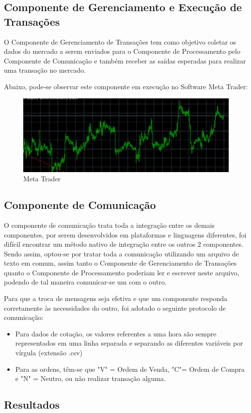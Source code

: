 \pagebreak

\subsection[Componente de Gerenciamento e Execução de Transações]{Componente de Gerenciamento e Execução de Transações}

O Componente de Gerenciamento de Transações tem como objetivo coletar os dados do mercado a serem enviados para o Componente de Processamento pelo Componente de Comunicação e também receber as saídas esperadas para realizar uma transação no mercado.

Abaixo, pode-se observar este componente em execução no Software Meta Trader:

\begin{figure}[h]
	\centering
	\includegraphics[keepaspectratio=true,scale=0.6]{figuras/meta.png}
	\caption{Meta Trader}
	\label{fig12}
\end{figure}

\pagebreak

\subsection[Componente de Comunicação]{Componente de Comunicação}

O componente de comunicação trata toda a integração entre os demais componentes, por serem desenvolvidos em plataformas e linguagens diferentes, foi difícil encontrar um método nativo de integração entre os outros 2 componentes.
Sendo assim, optou-se por tratar toda a comunicação utilizando um arquivo de texto em comum, assim tanto o Componente de Gerenciamento de Transações quanto o Componente de Processamento poderiam ler e escrever neste arquivo, podendo de tal maneira comunicar-se um com o outro.

Para que a troca de mensagens seja efetiva e que um componente responda corretamente às necessidades do outro, foi adotado o seguinte protocolo de comunicação:

\begin{itemize}
  \item Para dados de cotação, os valores referentes a uma hora são sempre representados em uma linha separada e separando as diferentes variáveis por vírgula (extensão .csv)
	\item Para as ordens, têm-se que "V" = Ordem de Venda, "C"= Ordem de Compra e "N" = Neutro, ou não realizar transação alguma.
\end{itemize}

\subsection[Resultados]{Resultados}
